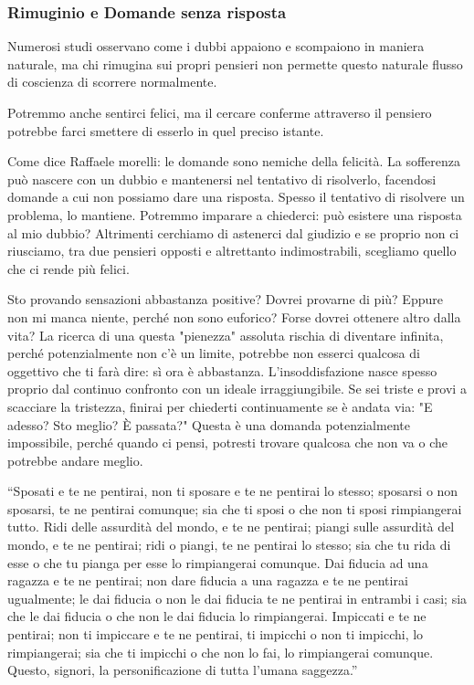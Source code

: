 \documentclass[12pt]{book} %
\begin{document}
\subsubsection{Rimuginio e Domande senza risposta}

Numerosi studi osservano come i dubbi appaiono e scompaiono in maniera naturale, ma chi rimugina sui propri pensieri non permette questo naturale flusso di coscienza di scorrere normalmente.

Potremmo anche sentirci felici, ma il cercare conferme attraverso il pensiero potrebbe farci smettere di esserlo in quel preciso istante. 

Come dice Raffaele morelli: le domande sono nemiche della felicità.
La sofferenza può nascere con un dubbio e mantenersi nel tentativo di risolverlo, facendosi domande a cui non possiamo dare una risposta. Spesso il tentativo di risolvere un problema, lo mantiene. Potremmo imparare a chiederci: può esistere una risposta al mio dubbio? Altrimenti cerchiamo di astenerci dal giudizio e se proprio non ci riusciamo, tra due pensieri opposti e altrettanto indimostrabili, scegliamo quello che ci rende più felici. 

Sto provando sensazioni abbastanza positive? Dovrei provarne di più? Eppure non mi manca niente, perché non sono euforico? Forse dovrei ottenere altro dalla vita? La ricerca di una questa "pienezza" assoluta rischia di diventare infinita, perché potenzialmente non c'è un limite, potrebbe non esserci qualcosa di oggettivo che ti farà dire: sì ora è abbastanza. L’insoddisfazione nasce spesso proprio dal continuo confronto con un ideale irraggiungibile.
Se sei triste e provi a scacciare la tristezza, finirai per chiederti continuamente se è andata via: "E adesso? Sto meglio? È passata?" Questa è una domanda potenzialmente impossibile, perché quando ci pensi, potresti trovare qualcosa che non va o che potrebbe andare meglio.

“Sposati e te ne pentirai, non ti sposare e te ne pentirai lo stesso; sposarsi o non sposarsi, te ne pentirai comunque;
sia che ti sposi o che non ti sposi rimpiangerai tutto. Ridi delle assurdità del mondo, e te ne pentirai; piangi sulle
assurdità del mondo, e te ne pentirai; ridi o piangi, te ne pentirai lo stesso; sia che tu rida di esse o che tu pianga
per esse lo rimpiangerai comunque. Dai fiducia ad una ragazza e te ne pentirai; non dare fiducia a una ragazza e te ne
pentirai ugualmente; le dai fiducia o non le dai fiducia te ne pentirai in entrambi i casi; sia che le dai fiducia o
che non le dai fiducia lo rimpiangerai. Impiccati e te ne pentirai; non ti impiccare e te ne pentirai, ti impicchi o
non ti impicchi, lo rimpiangerai; sia che ti impicchi o che non lo fai, lo rimpiangerai comunque. Questo, signori, la
personificazione di tutta l'umana saggezza.”
\end{document}
